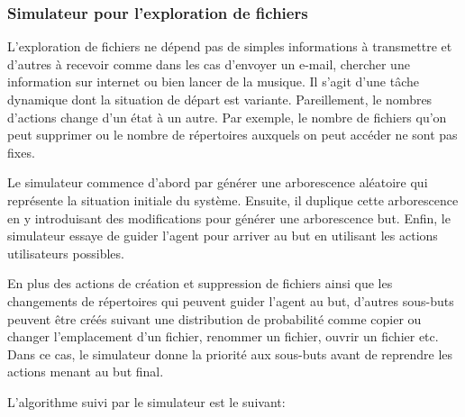 \subsubsection*{Simulateur pour l'exploration de fichiers}
L'exploration de fichiers ne dépend pas de simples informations à transmettre et d'autres à recevoir comme dans les cas d'envoyer un e-mail, chercher une information sur internet ou bien lancer de la musique. Il s'agit d'une tâche dynamique dont la situation de départ est variante. Pareillement, le nombres d'actions change d'un état à un autre. Par exemple, le nombre de fichiers qu'on peut supprimer ou le nombre de répertoires auxquels on peut accéder ne sont pas fixes.
\par Le simulateur commence d'abord par générer une arborescence aléatoire qui représente la situation initiale du système. Ensuite, il duplique cette arborescence en y introduisant des modifications pour générer une arborescence but. Enfin, le simulateur essaye de guider l'agent pour arriver au but en utilisant les actions utilisateurs possibles.
\par En plus des actions de création et suppression de fichiers ainsi que les changements de répertoires qui peuvent guider l'agent au but, d'autres sous-buts peuvent être créés suivant une distribution de probabilité comme copier ou changer l'emplacement d'un fichier, renommer un fichier, ouvrir un fichier etc. Dans ce cas, le simulateur donne la priorité aux sous-buts avant de reprendre les actions menant au but final.
\par L'algorithme suivi par le simulateur est le suivant:
\makeatletter
\def\BState{\State\hskip-\ALG@thistlm}
\makeatother

